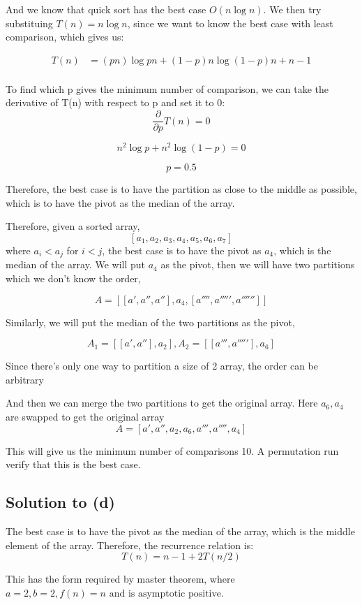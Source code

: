 \documentclass{article}
\begin{document}
And we know that quick sort has the best case \(O(n\log n)\). We then try substituing \(T(n) = n\log n\), since we want to know the best case with least comparison, which gives us:

\begin{align*}
T(n) &= (pn) \log pn + (1-p)n \log (1-p)n + n - 1 \\
\end{align*}

To find which p gives the minimum number of comparison, we can take the derivative of T(n) with respect to p and set it to 0:
\[
\frac{\partial}{\partial p} T(n) = 0
\]

\[
n^2\log p + n^2\log (1-p) = 0
\]

\[p = 0.5\]


Therefore, the best case is to have the partition as close to the middle as possible, which is to have the pivot as the median of the array.

Therefore, given a sorted array, \[[a_1, a_2, a_3, a_4, a_5, a_6, a_7]\] where \(a_i < a_j\) for \(i < j\), the best case is to have the pivot as \(a_4\), which is the median of the array. We will put \(a_4\) as the pivot, then we will have two partitions which we don't know the order,

\[A = [[a', a'', a''], a_4, [a'''', a''''', a'''''']]\]

Similarly, we will put the median of the two partitions as the pivot,

\[A_1 = [[a', a''], a_2], A_2 = [[a''', a'''''], a_6]\]


Since there's only one way to partition a size of 2 array, the order can be arbitrary

And then we can merge the two partitions to get the original array. Here \(a_6, a_4\) are swapped to get the original array
\[A = [a', a'', a_2, a_6, a''', a'''', a_4]\]

This will give us the minimum number of comparisons 10. A permutation run verify that this is the best case.
\newpage
\subsection*{Solution to (d)}

The best case is to have the pivot as the median of the array, which is the middle element of the array. Therefore, the recurrence relation is: \[T(n) = n - 1 + 2T(n/2)\]

This has the form required by master theorem, where \(a = 2, b = 2, f(n) = n \text{ and is asymptotic positive}\).
\end{document}
